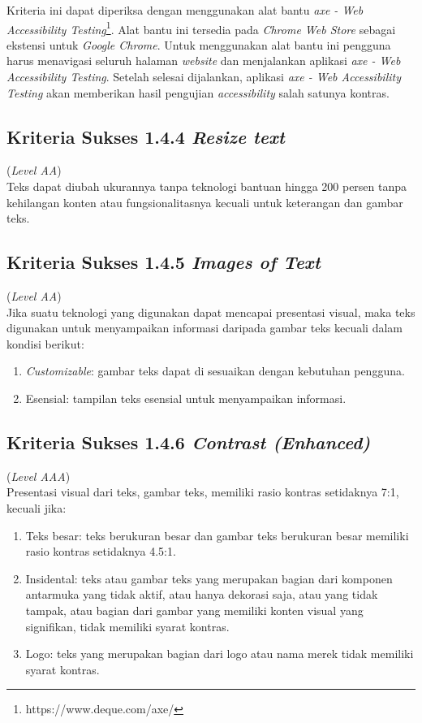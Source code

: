 Kriteria ini dapat diperiksa dengan menggunakan alat bantu \textit{axe - Web Accessibility Testing}\footnote{https://www.deque.com/axe/}. Alat bantu ini tersedia pada \textit{Chrome Web Store} sebagai ekstensi untuk \textit{Google Chrome}. Untuk menggunakan alat bantu ini pengguna harus menavigasi seluruh halaman \textit{website} dan menjalankan aplikasi \textit{axe - Web Accessibility Testing}. Setelah selesai dijalankan, aplikasi \textit{axe - Web Accessibility Testing} akan memberikan hasil pengujian \textit{accessibility} salah satunya kontras.

\subsection{Kriteria Sukses 1.4.4 \textit{Resize text}}
\label{subsec:kriteria_1.4.4}
(\textit{Level AA}) \\

Teks dapat diubah ukurannya tanpa teknologi bantuan hingga 200 persen tanpa kehilangan konten atau fungsionalitasnya kecuali untuk keterangan dan gambar teks.

\subsection{Kriteria Sukses 1.4.5 \textit{Images of Text}}
\label{subsec:kriteria_1.4.5}
(\textit{Level AA}) \\

Jika suatu teknologi yang digunakan dapat mencapai presentasi visual, maka teks digunakan untuk menyampaikan informasi daripada gambar teks kecuali dalam kondisi berikut:

\begin{enumerate}
	\item \textit{Customizable}: gambar teks dapat di sesuaikan dengan kebutuhan pengguna.
	\item Esensial: tampilan teks esensial untuk menyampaikan informasi.
\end{enumerate}

\subsection{Kriteria Sukses 1.4.6 \textit{Contrast (Enhanced)}}
\label{subsec:kriteria_1.4.6}
(\textit{Level AAA}) \\

Presentasi visual dari teks, gambar teks, memiliki rasio kontras setidaknya 7:1, kecuali jika:

\begin{enumerate}
	\item Teks besar: teks berukuran besar dan gambar teks berukuran besar memiliki rasio kontras setidaknya 4.5:1.
	\item Insidental: teks atau gambar teks yang merupakan bagian dari komponen antarmuka yang tidak aktif, atau hanya dekorasi saja, atau yang tidak tampak, atau bagian dari gambar yang memiliki konten visual yang signifikan, tidak memiliki syarat kontras.
	\item Logo: teks yang merupakan bagian dari logo atau nama merek tidak memiliki syarat kontras.
\end{enumerate}

